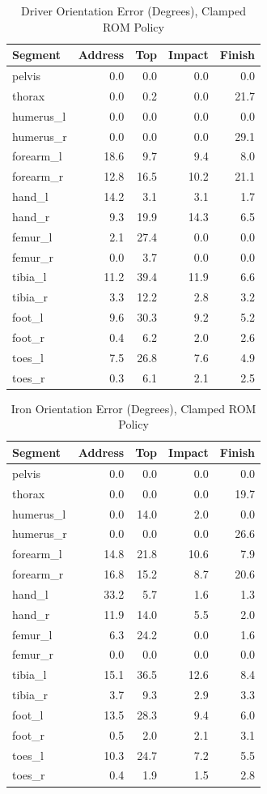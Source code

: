 \documentclass[11pt,a4paper]{article}
\begin{document}
\begin{table}[h]\centering\small
\caption{Driver Orientation Error (Degrees), Clamped ROM Policy}
\begin{tabular}{lrrrr}\toprule Segment & Address & Top & Impact & Finish \\\midrule
pelvis & 0.0 & 0.0 & 0.0 & 0.0 \\
thorax & 0.0 & 0.2 & 0.0 & 21.7 \\
humerus\_l & 0.0 & 0.0 & 0.0 & 0.0 \\
humerus\_r & 0.0 & 0.0 & 0.0 & 29.1 \\
forearm\_l & 18.6 & 9.7 & 9.4 & 8.0 \\
forearm\_r & 12.8 & 16.5 & 10.2 & 21.1 \\
hand\_l & 14.2 & 3.1 & 3.1 & 1.7 \\
hand\_r & 9.3 & 19.9 & 14.3 & 6.5 \\
femur\_l & 2.1 & 27.4 & 0.0 & 0.0 \\
femur\_r & 0.0 & 3.7 & 0.0 & 0.0 \\
tibia\_l & 11.2 & 39.4 & 11.9 & 6.6 \\
tibia\_r & 3.3 & 12.2 & 2.8 & 3.2 \\
foot\_l & 9.6 & 30.3 & 9.2 & 5.2 \\
foot\_r & 0.4 & 6.2 & 2.0 & 2.6 \\
toes\_l & 7.5 & 26.8 & 7.6 & 4.9 \\
toes\_r & 0.3 & 6.1 & 2.1 & 2.5 \\
\bottomrule\end{tabular}\end{table}

\begin{table}[h]\centering\small
\caption{Iron Orientation Error (Degrees), Clamped ROM Policy}
\begin{tabular}{lrrrr}\toprule Segment & Address & Top & Impact & Finish \\\midrule
pelvis & 0.0 & 0.0 & 0.0 & 0.0 \\
thorax & 0.0 & 0.0 & 0.0 & 19.7 \\
humerus\_l & 0.0 & 14.0 & 2.0 & 0.0 \\
humerus\_r & 0.0 & 0.0 & 0.0 & 26.6 \\
forearm\_l & 14.8 & 21.8 & 10.6 & 7.9 \\
forearm\_r & 16.8 & 15.2 & 8.7 & 20.6 \\
hand\_l & 33.2 & 5.7 & 1.6 & 1.3 \\
hand\_r & 11.9 & 14.0 & 5.5 & 2.0 \\
femur\_l & 6.3 & 24.2 & 0.0 & 1.6 \\
femur\_r & 0.0 & 0.0 & 0.0 & 0.0 \\
tibia\_l & 15.1 & 36.5 & 12.6 & 8.4 \\
tibia\_r & 3.7 & 9.3 & 2.9 & 3.3 \\
foot\_l & 13.5 & 28.3 & 9.4 & 6.0 \\
foot\_r & 0.5 & 2.0 & 2.1 & 3.1 \\
toes\_l & 10.3 & 24.7 & 7.2 & 5.5 \\
toes\_r & 0.4 & 1.9 & 1.5 & 2.8 \\
\bottomrule\end{tabular}\end{table}
\end{document}
